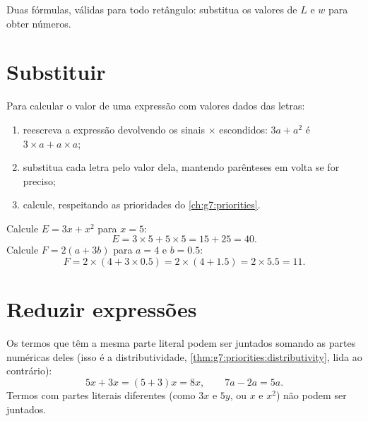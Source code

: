 \begin{omfigure}

{\small Duas fórmulas, válidas para todo retângulo: substitua os
valores de $L$ e $w$ para obter números.}
\end{omfigure}

\section{Substituir}

\begin{method}\label{met:g7:literal:substitute}
Para calcular o valor de uma expressão com valores dados das letras:
\begin{enumerate}
  \item reescreva a expressão devolvendo os sinais $\times$
        escondidos: $3a + a^2$ é $3 \times a + a \times a$;
  \item substitua cada letra pelo valor dela, mantendo parênteses em
        volta se for preciso;
  \item calcule, respeitando as prioridades do
        \cref{ch:g7:priorities}.
\end{enumerate}
\end{method}

\begin{example}\label{ex:g7:literal:substitute}
Calcule $E = 3x + x^2$ para $x = 5$:
\[
E = 3 \times 5 + 5 \times 5 = 15 + 25 = 40 .
\]
Calcule $F = 2(a + 3b)$ para $a = 4$ e $b = 0.5$:
\[
F = 2 \times (4 + 3 \times 0.5) = 2 \times (4 + 1.5) = 2 \times 5.5
= 11 .
\]
\end{example}

\section{Reduzir expressões}

\begin{proposition}\label{prop:g7:literal:reduce}
Os termos que têm a mesma parte literal podem ser juntados somando as
partes numéricas deles (isso é a distributividade,
\cref{thm:g7:priorities:distributivity}, lida ao contrário):
\[
5x + 3x = (5 + 3)x = 8x,
\qquad
7a - 2a = 5a .
\]
Termos com partes literais diferentes (como $3x$ e $5y$, ou $x$ e
$x^2$) não podem ser juntados.
\end{proposition}

